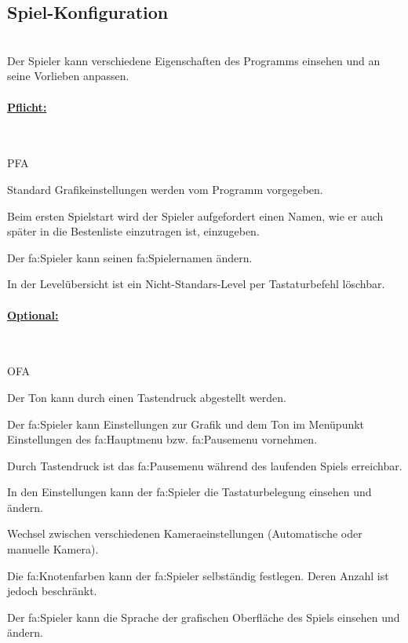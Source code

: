 %
%


\subsection{Spiel-Konfiguration}

%
%
\renewcommand{\K}{}
%
%

~\\
Der Spieler kann verschiedene Eigenschaften des Programms einsehen und an seine Vorlieben anpassen.\\

%
%
\paragraph*{\underline{Pflicht:}}~\\

\begin{ids}{\gls{PFA\K}}

 	\id[ 10] Standard Grafikeinstellungen werden vom Programm vorgegeben.
 	
 	\id[ 15] Beim ersten Spielstart wird der Spieler aufgefordert einen Namen, wie er auch später in die Bestenliste einzutragen ist, einzugeben.
 		
 	\id[ 20] Der \gls{fa:Spieler} kann seinen \gls{fa:Spielername}n ändern.
 	 	
 	\id[ 27] In der Levelübersicht ist ein Nicht-Standars-Level per Tastaturbefehl löschbar.
	
\end{ids}


%
%
\paragraph*{\underline{Optional:}}~\\


\begin{ids}{\gls{OFA\K}}

 	\id[ 25] Der Ton kann durch einen Tastendruck abgestellt werden.

	\id[ 30] Der \gls{fa:Spieler} kann Einstellungen zur Grafik und dem Ton im Menüpunkt Einstellungen des \gls{fa:Hauptmenu} bzw. \gls{fa:Pausemenu} vornehmen.
	
	\id[ 40] Durch Tastendruck ist das \gls{fa:Pausemenu} während des laufenden Spiels erreichbar.	
	
	\id[ 50] In den Einstellungen kann der \gls{fa:Spieler} die Tastaturbelegung einsehen und  ändern.
	
 	\id[60] Wechsel zwischen verschiedenen Kameraeinstellungen (Automatische oder manuelle Kamera).
 	
 	\id[ 70] Die \gls{fa:Knoten}farben kann der \gls{fa:Spieler} selbständig festlegen. Deren Anzahl ist jedoch beschränkt.
 	
 	\id[ 80] Der \gls{fa:Spieler} kann die Sprache der grafischen Oberfläche des Spiels einsehen und ändern.
 	
\end{ids}


